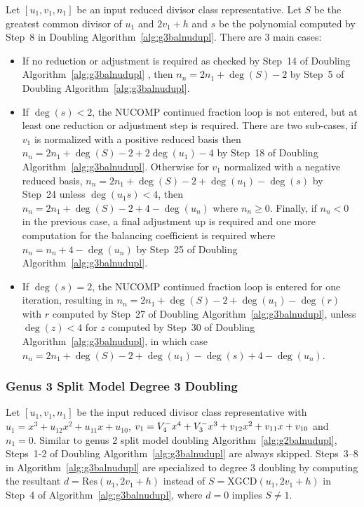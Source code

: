 Let $[u_1,v_1,n_1]$ be an input reduced divisor class representative. Let $S$ be
the greatest common divisor of $u_1$ and $2v_1 + h$ and $s$ be the
polynomial computed by Step~8 in Doubling Algorithm~\ref{alg:g3balnudupl}.
There are 3 main cases:\begin{itemize}
    \item [1.] If no reduction or adjustment is required as checked by Step~14
    of Doubling Algorithm~\ref{alg:g3balnudupl} , then $n_n = 2n_1 + \deg(S) -
    2$ by Step~5 of Doubling Algorithm~\ref{alg:g3balnudupl}.
    \item [2.] If $\deg(s) < 2 $, the NUCOMP continued fraction loop is not
    entered, but at least one reduction or adjustment step is required. There
    are two sub-cases, if $v_1$ is normalized with a positive reduced basis then
    $n_n = 2n_1 + \deg(S) - 2 + 2\deg(u_1) - 4$ by Step~18 of Doubling
    Algorithm~\ref{alg:g3balnudupl}. Otherwise for $v_1$ normalized with a
    negative reduced basis, $n_n = 2n_1 + \deg(S) - 2 + \deg(u_1) - \deg(s)$ by
    Step~24 unless $\deg(u_1s) < 4$, then $n_n = 2n_1 + \deg(S) - 2 + 4 -
    \deg(u_n)$ where $n_n \geq 0$. Finally, if $n_n < 0$ in the previous case, a
    final adjustment up is required and  one more computation for the balancing
    coefficient is required where $n_n = n_n + 4 - \deg(u_n)$ by Step~25 of
    Doubling Algorithm~\ref{alg:g3balnudupl}.
    \item [3.] If $\deg(s) = 2$, the NUCOMP continued fraction loop is entered
    for one iteration, resulting in $n_n = 2n_1 + \deg(S) - 2 + \deg(u_1) -
    \deg(r)$ with $r$ computed by Step~27 of Doubling
    Algorithm~\ref{alg:g3balnudupl}, unless $\deg(z) < 4$ for $z$ computed by
    Step~30 of Doubling Algorithm~\ref{alg:g3balnudupl}, in which case $n_n = 2n_1 +
    \deg(S) - 2 + \deg(u_1) - \deg(s) + 4 - \deg(u_n)$.
\end{itemize}

\subsubsection{Genus 3 Split Model Degree 3 Doubling}
Let $[u_1,v_1,n_1]$ be the input reduced divisor class representative with $u_1 = x^3 +
u_{12}x^2 + u_{11}x + u_{10}$, $v_1 = V^{-}_4x^4 + V^{-}_3x^3 + v_{12}x^2 + v_{11}x
+ v_{10}$ and $n_1 = 0$. Similar to genus 2 split model doubling
Algorithm~\ref{alg:g2balnudupl}, Steps~1-2 of Doubling
Algorithm~\ref{alg:g3balnudupl} are always skipped. Steps~3--8 in
Algorithm~\ref{alg:g3balnudupl} are specialized to degree 3 doubling by
computing the resultant $d = \mathrm{Res}(u_1,2v_1+h)$ instead of $S =
\mathrm{XGCD}(u_1,2v_1 + h)$ in Step~4 of Algorithm~\ref{alg:g3balnudupl}, where
$d=0$ implies $S \neq 1$. 


